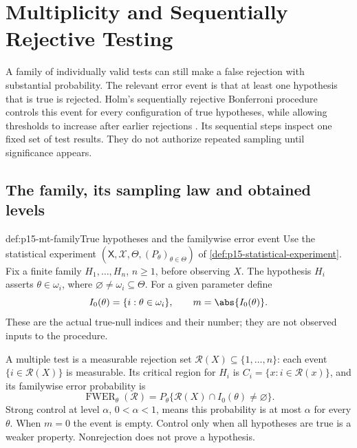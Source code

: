 \chapter{Multiplicity and Sequentially Rejective Testing}
\label{sec:p15-multiple-testing}

A family of individually valid tests can still make a false rejection
with substantial probability. The relevant error event is that at least
one hypothesis that is true is rejected. Holm's sequentially rejective
Bonferroni procedure controls this event for every configuration of true
hypotheses, while allowing thresholds to increase after earlier
rejections \cite[pp.~65--70]{Holm1979Original}.
Its sequential steps inspect one fixed set of test results.
They do not authorize repeated sampling until significance appears.

\section{The family, its sampling law and obtained levels}
\label{sec:p15-mt-family}

\begin{hbdefinition}{def:p15-mt-family}{True hypotheses and the familywise error event}
Use the statistical experiment
\((\mathsf X,\mathscr X,\Theta,(P_\theta)_{\theta\in\Theta})\)
of \cref{def:p15-statistical-experiment}. Fix a finite family
\(H_1,\ldots,H_n\), \(n\geq1\), before observing \(X\).
The hypothesis \(H_i\) asserts \(\theta\in\omega_i\), where
\(\varnothing\ne\omega_i\subseteq\Theta\).
For a given parameter define
\[
 I_0(\theta)=\{i:\theta\in\omega_i\},\qquad m=\abs{I_0(\theta)}.
\]
These are the actual true-null indices and their number; they are not
observed inputs to the procedure.

A multiple test is a measurable rejection set
\(\mathcal R(X)\subseteq\{1,\ldots,n\}\): each event
\(\{i\in\mathcal R(X)\}\) is measurable. Its critical region for \(H_i\)
is \(C_i=\{x:i\in\mathcal R(x)\}\), and its familywise error probability is
\[
 \operatorname{FWER}_\theta(\mathcal R)
   =P_\theta\{\mathcal R(X)\cap I_0(\theta)\ne\varnothing\}.
\]
Strong control at level \(\alpha\), \(0<\alpha<1\), means this probability
is at most \(\alpha\) for every \(\theta\).
When \(m=0\) the event is empty. Control only when all hypotheses are true
is a weaker property. Nonrejection does not prove a hypothesis.
\end{hbdefinition}

